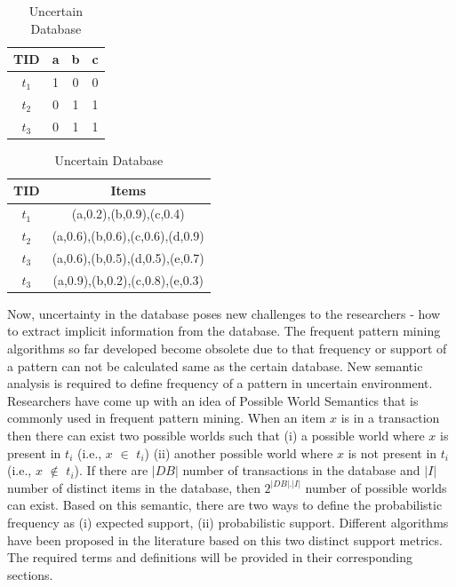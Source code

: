 \begin{table}
\parbox{.45\linewidth}{
\centering
\begin{tabular}{| c | c | c | c|}\hline
TID & a & b & c\\ \hline  \hline
$t_1$ & 1  & 0 & 0 \\ \hline
$t_2$ & 0  & 1 & 1 \\ \hline
$t_3$ & 0  & 1 & 1 \\ \hline
\end{tabular}
\caption{Certain Database}
\label{table:certain}
}
\hfill
\parbox{.45\linewidth}{
\centering
\begin{tabular}{| c | c |}\hline
TID & Items \\ \hline  \hline
$t_1$ & (a,0.2),(b,0.9),(c,0.4) \\ \hline
$t_2$ & (a,0.6),(b,0.6),(c,0.6),(d,0.9) \\ \hline
$t_3$ & (a,0.6),(b,0.5),(d,0.5),(e,0.7) \\ \hline
$t_3$ & (a,0.9),(b,0.2),(c,0.8),(e,0.3) \\ \hline
\end{tabular}
\caption{Uncertain Database}
\label{table:uncertain}
}
\end{table}

Now, uncertainty in the database poses new challenges to the researchers - how to extract implicit information from the database. The frequent pattern mining algorithms so far developed become obsolete due to that frequency or support of a pattern can not be calculated same as the certain database. New semantic analysis is required to define frequency of a pattern in uncertain environment. Researchers have come up with an idea of Possible World Semantics that is commonly used in frequent pattern mining. When an item $x$ is in a transaction then there can exist two possible worlds such that (i) a possible world where $x$ is present in $t_i$ (i.e., $x$ $\in$ $t_i$) (ii) another possible world where $x$ is not present in $t_i$ (i.e., $x$ $\notin$ $t_i$). If there are $|DB|$ number of transactions in the database and $|I|$ number of distinct items in the database, then $2^{|DB|.|I|}$ number of possible worlds can exist. Based on this semantic, there are two ways to define the probabilistic frequency as (i) expected support, (ii) probabilistic support. Different algorithms have been proposed in the literature based on this two distinct support metrics. The required terms and definitions will be provided in their corresponding sections.



